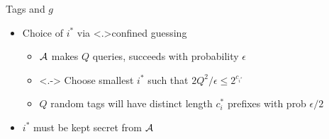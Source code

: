 \documentclass[shadow,xcolor=pdftex,svgnames,table,t]{beamer}
\begin{document}
\begin{frame}[label=tags]{Tags and $g$}
\begin{itemize}
\item<+-> Choice of $i^*$ via \alert<.>{confined guessing}
  {\citationsize [BHJ+14,DM14]}
 \begin{itemize}
 \item<+->  $\mathcal{A}$ makes $Q$ queries, succeeds with probability
   $\epsilon$
\smallskip 
 \item<.-> Choose smallest $i^*$ such that $2Q^2/\epsilon \leq
   2^{c_{i^*}}$
\smallskip 
\item<+-> $Q$ random tags will have distinct length
  $c_i^*$ prefixes with prob $\epsilon/2$
 \end{itemize}
\item<+-> $i^*$ must be kept secret from $\mathcal{A}$ 
\smallskip
 \end{itemize}
 \end{frame}
\end{document}
